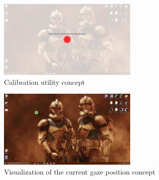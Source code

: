 \begin{figure}[h!]
	\centering
   	\includegraphics[width=0.60\textwidth]{images/project-iris-calibration}
    \caption{Calibration utility concept}
\end{figure}

\begin{figure}[h!]
	\centering
   	\includegraphics[width=0.60\textwidth]{images/project-iris-visualization}
    \caption{Visualization of the current gaze position concept}
\end{figure}
